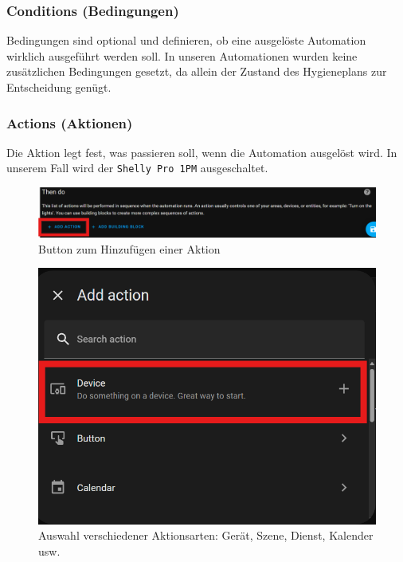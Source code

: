 \subsubsection{Conditions (Bedingungen)}
Bedingungen sind optional und definieren, ob eine ausgelöste Automation wirklich ausgeführt werden soll. In unseren Automationen wurden keine zusätzlichen Bedingungen gesetzt, da allein der Zustand des Hygieneplans zur Entscheidung genügt.

\subsubsection{Actions (Aktionen)}
Die Aktion legt fest, was passieren soll, wenn die Automation ausgelöst wird. In unserem Fall wird der \texttt{Shelly Pro 1PM} ausgeschaltet.

\begin{figure}[H]
    \centering
    \includegraphics[width=0.8\linewidth]{images/auto_addaction.png}
    \caption{Button zum Hinzufügen einer Aktion}
\end{figure}

\begin{figure}[H]
    \centering
    \includegraphics[width=\linewidth]{images/auto_action2.png}
    \caption{Auswahl verschiedener Aktionsarten: Gerät, Szene, Dienst, Kalender usw.}
\end{figure}

